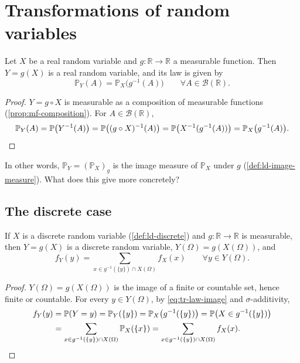 \section{Transformations of random variables}\label{sec:tr-transformations}

\begin{proposition}\label{prop:tr-law-image}
Let $X$ be a real random variable and $g:\mathbb R\to\mathbb R$ a measurable function. Then
$Y=g(X)$ is a real random variable, and its law is given by
\begin{equation}\label{eq:tr-law-image}
  \mathbb P_Y(A)=\mathbb P_X\big(g^{-1}(A)\big)\qquad\forall A\in\mathcal B(\mathbb R).
\end{equation}
\end{proposition}

\begin{proof}
$Y=g\circ X$ is measurable as a composition of measurable functions (\cref{prop:mf-composition}).
For $A\in\mathcal B(\mathbb R)$,
\[
  \mathbb P_Y(A)=\mathbb P\big(Y^{-1}(A)\big)=\mathbb P\big((g\circ X)^{-1}(A)\big)
  =\mathbb P\big(X^{-1}(g^{-1}(A))\big)=\mathbb P_X\big(g^{-1}(A)\big).\qedhere
\]
\end{proof}

In other words, $\mathbb P_Y=(\mathbb P_X)_g$ is the image measure of $\mathbb P_X$ under $g$
(\cref{def:ld-image-measure}). What does this give more concretely?

\subsection{The discrete case}\label{sec:tr-discrete-case}

\begin{proposition}\label{thm:tr-discrete}
If $X$ is a discrete random variable (\cref{def:ld-discrete}) and $g:\mathbb R\to\mathbb R$ is
measurable, then $Y=g(X)$ is a discrete random variable, $Y(\Omega)=g(X(\Omega))$, and
\[
  f_Y(y)=\sum_{x\in g^{-1}(\{y\})\cap X(\Omega)}f_X(x)\qquad\forall y\in Y(\Omega).
\]
\end{proposition}

\begin{proof}
$Y(\Omega)=g(X(\Omega))$ is the image of a finite or countable set, hence finite or countable.
For every $y\in Y(\Omega)$, by \eqref{eq:tr-law-image} and $\sigma$-additivity,
\[
\begin{aligned}
  f_Y(y)&=\mathbb P(Y=y)=\mathbb P_Y(\{y\})=\mathbb P_X\big(g^{-1}(\{y\})\big)=\mathbb P\big(X\in g^{-1}(\{y\})\big)\\
  &=\sum_{x\in g^{-1}(\{y\})\cap X(\Omega)}\mathbb P_X(\{x\})=\sum_{x\in g^{-1}(\{y\})\cap X(\Omega)}f_X(x).
\end{aligned}\qedhere
\]
\end{proof}

